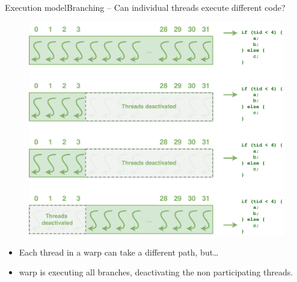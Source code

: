 \documentclass[aspectratio=169,12pt]{beamer}
\begin{document}
\begin{frame}{Execution model}{Branching -- Can individual threads execute different code?}
  \begin{minipage}{.5\textwidth}
    \begin{figure}
      \centering
      \includegraphics[height=.75\textheight]{warp_divergence}
    \end{figure}
  \end{minipage}
  \hfill
  \pause
  \begin{minipage}{.4\textwidth}
    \footnotesize
    \begin{itemize}
    \item Each thread in a warp can take a different path, but\dots
      \vspace\baselineskip
    \item warp is executing all branches, deactivating the non participating threads.
    \end{itemize}
  \end{minipage}
\end{frame}
\end{document}
